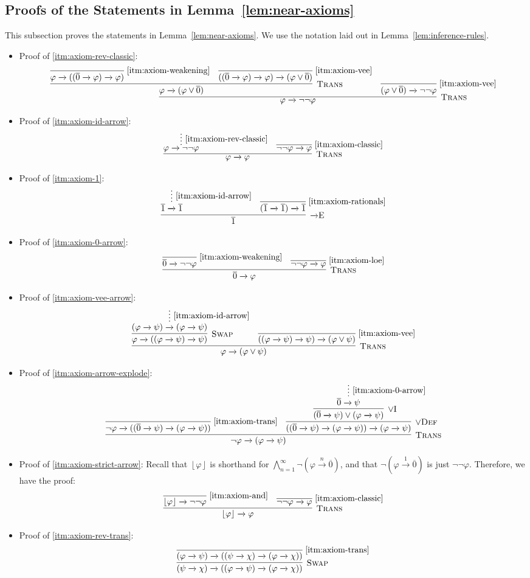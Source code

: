\documentclass{amsart}
\theoremstyle{definition}
\numberwithin{equation}{theorem}
\renewcommand{\phi}{\varphi}
\newcommand{\unvee}{{\vee}}
\newcommand{\strict}[1]{{\left\lfloor#1\right\rfloor}}
\newcommand{\rat}[1]{{\overline{#1}}}
\newcommand{\narrow}[1]{\xrightarrow{#1}}
\renewcommand{\to}{\narrow{}}
\newcommand{\arr}{{\to}}
\newcommand{\intro}{\!\operatorname{I}}
\newcommand{\elim}{\!\operatorname{E}}
\newcommand{\trans}{\text{\sc{Trans}}}
\newcommand{\aref}[1]{\!\text{\ref{itm:axiom-#1}}}
\newcommand{\ordef}{\unvee\text{\sc{Def}}}
\newcommand{\swap}{\text{\sc{Swap}}}
\begin{document}
\subsection{Proofs of the Statements in Lemma~\ref{lem:near-axioms}}\label{sub:basic-proofs}
This subsection proves the statements in Lemma~\ref{lem:near-axioms}.
We use the notation laid out in Lemma~\ref{lem:inference-rules}.
\begin{itemize}
\item Proof of \ref{itm:axiom-rev-classic}:
	\[
	  \infer[\trans]{\phi\to\neg\neg \phi}{
	    \infer[\trans]{\phi\to(\phi\vee\rat0)}{
	      \infer[\aref{weakening}]{\phi\to((\rat0\to \phi)\to \phi)}{} &
	      \infer[\aref{vee}]{((\rat0\to \phi)\to \phi)\to (\phi\vee\rat0)}{}
	    } &
	    \infer[\aref{vee}]{(\phi\vee\rat0)\to\neg\neg \phi}{}
	  }
	\]
\item Proof of \ref{itm:axiom-id-arrow}:
	\[
	  \infer[\trans]{\phi\to \phi}{
	    \infer*[\aref{rev-classic}]{\phi\to\neg\neg \phi}{} &
	    \infer[\aref{classic}]{\neg\neg \phi\to \phi}{}
	  }
	\]
\item Proof of \ref{itm:axiom-1}:
	\[
	  \infer[\arr\elim]{\rat1}{
	    \infer*[\aref{id-arrow}]{\rat1\to\rat1}{} &
	    \infer[\aref{rationals}]{(\rat1\to\rat1)\to\rat1}{}
	  }
	\]
\item Proof of \ref{itm:axiom-0-arrow}:
	\[
	  \infer[\trans]{\rat0\to \phi}{
	    \infer[\aref{weakening}]{\rat0\to\neg\neg \phi}{} &
	    \infer[\aref{loe}]{\neg\neg \phi\to \phi}{}
	  }
	\]
\item Proof of \ref{itm:axiom-vee-arrow}:
  \[
    \infer[\trans]{\phi\to(\phi\vee\psi)}{
      \infer[\swap]{\phi\to((\phi\to\psi)\to\psi)}{
        \infer*[\aref{id-arrow}]{(\phi\to\psi)\to(\phi\to\psi)}{}
      } &
      \infer[\aref{vee}]{((\phi\to\psi)\to\psi)\to(\phi\vee\psi)}{}
    }
  \]
\item Proof of \ref{itm:axiom-arrow-explode}:
	\[
	  \infer[\trans]{\neg\phi\to(\phi\to\psi)}{
	    \infer[\aref{trans}]{\neg\phi\to((\rat0\to\psi)\to(\phi\to\psi))}{} &
	    \infer[\ordef]{((\rat0\to\psi)\to(\phi\to\psi))\to(\phi\to\psi)}{
	      \infer[\unvee\intro]{(\rat0\to\psi)\vee(\phi\to\psi)}{
	        \infer*[\aref{0-arrow}]{\rat0\to\psi}{}
	      }
	    }
	  }
	\]
\item Proof of \ref{itm:axiom-strict-arrow}:
  Recall that $\strict\phi$ is shorthand for $\bigwedge_{n=1}^\infty\neg(\phi\narrow n\rat 0)$, and that $\neg(\phi\narrow1\rat0)$ is just $\neg\neg\phi$.
  Therefore, we have the proof:
	\[
	  \infer[\trans]{\strict\phi\to\phi}{
	    \infer[\aref{and}]{\strict\phi\to\neg\neg\phi}{} &
	    \infer[\aref{classic}]{\neg\neg\phi\to\phi}{}
	  }
	\]
\item Proof of \ref{itm:axiom-rev-trans}:
  \[
    \infer[\swap]{(\psi\to\chi)\to((\phi\to\psi)\to(\phi\to\chi))}{
      \infer[\aref{trans}]{(\phi\to\psi)\to((\psi\to\chi)\to(\phi\to\chi))}{}
    }
  \]
\end{itemize}
\end{document}
